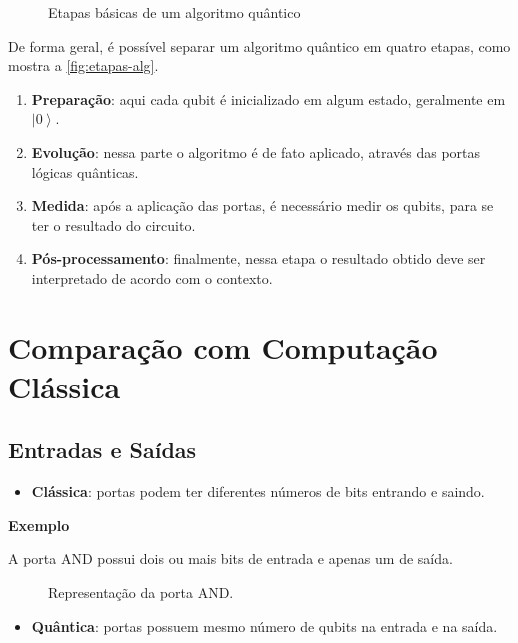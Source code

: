 \begin{figure}[!htp]
    \centering
    
    \caption{Etapas básicas de um algoritmo quântico}
    \label{fig:etapas-alg}
\end{figure}

De forma geral, é possível separar um algoritmo quântico em quatro etapas, como mostra a \autoref{fig:etapas-alg}.

\begin{enumerate}
\tightlist
\item
  \textbf{Preparação}: aqui cada qubit é inicializado em algum estado,
  geralmente em \(\left| 0 \right\rangle\).
\item
  \textbf{Evolução}: nessa parte o algoritmo é de fato aplicado, através
  das portas lógicas quânticas.
\item
  \textbf{Medida}: após a aplicação das portas, é necessário medir os
  qubits, para se ter o resultado do circuito.
\item
  \textbf{Pós-processamento}: finalmente, nessa etapa o resultado obtido
  deve ser interpretado de acordo com o contexto.
\end{enumerate}

\section{Comparação com Computação Clássica}\label{sec:compare}

\subsection{Entradas e Saídas}\label{subsec:entradas-e-saidas}

\begin{itemize}
\tightlist
\item
  \textbf{Clássica}: portas podem ter diferentes números de bits
  entrando e saindo.
\end{itemize}

\textbf{Exemplo}

A porta AND possui dois ou mais bits de entrada e apenas um de saída.

\begin{figure}
    \centering
    
    \caption{Representação da porta AND.}
    \label{fig:and}
\end{figure}

\begin{itemize}
\tightlist
\item
  \textbf{Quântica}: portas possuem mesmo número de qubits na entrada e
  na saída.
\end{itemize}

